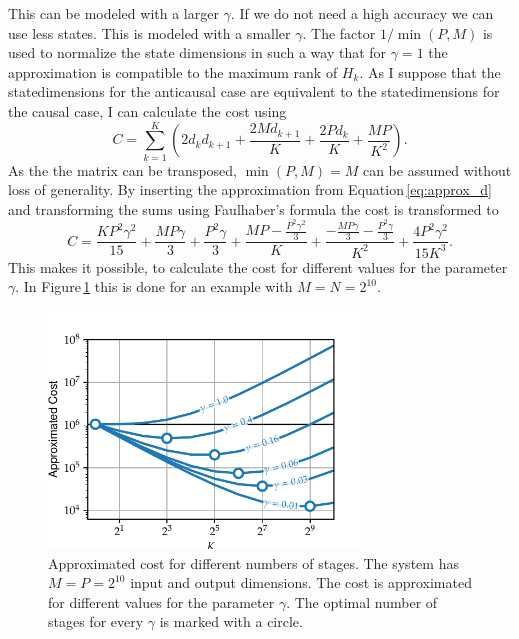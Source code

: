 \documentclass[doctype=mastersthesis,BCOR=15mm,biblatex]{ldvbook}%
\begin{document}
This can be modeled with a larger $\gamma$.
If we do not need a high accuracy we can use less states.
This is modeled with a smaller $\gamma$.
The factor $1/\min(P,M)$ is used to normalize the state dimensions in such a way that for $\gamma = 1$ the approximation is compatible to the maximum rank of $H_k$. 
As I suppose that the statedimensions for the anticausal case are equivalent to the statedimensions for the causal case, I can calculate the cost using
\begin{equation}
C = \sum_{k=1}^{K} \left(2 d_{k} d_{k+1} + \frac{2 M d_{k+1}}{K} + \frac{2 P d_{k}}{K} + \frac{M P}{K^{2}}\right)
.
\end{equation}
As the the matrix can be transposed, $\min(P,M)=M$ can be assumed without loss of generality.
By inserting the approximation from Equation\,\ref{eq:approx_d} and transforming the sums using Faulhaber's formula \cite{knuth_johann_1993} the cost is transformed to
\begin{equation}\label{eq:cost_of_K}
C = \frac{K P^{2} \gamma^{2}}{15} + \frac{M P \gamma}{3} + \frac{P^{2} \gamma}{3} + \frac{M P - \frac{P^{2} \gamma^{2}}{3}}{K} + \frac{- \frac{M P \gamma}{3} - \frac{P^{2} \gamma}{3}}{K^{2}} + \frac{4 P^{2} \gamma^{2}}{15 K^{3}}
.
\end{equation}
This makes it possible, to calculate the cost for different values for the parameter $\gamma$.
In Figure\,\ref{fig:cost_parameters} 
this is done for an example with $M=N = 2^{10}$.
\begin{figure}[htb]
	\centering
	\includegraphics[width=0.75\textwidth]{Plots/cost_parameters.pdf}
	\caption{Approximated cost for different numbers of stages. The system has $M=P=2^{10}$ input and output dimensions. 
	The cost is approximated for different values for the parameter $\gamma$.
	The optimal number of stages for every $\gamma$ is marked with a circle.}
	\label{fig:cost_parameters}
\end{figure}
\end{document}
